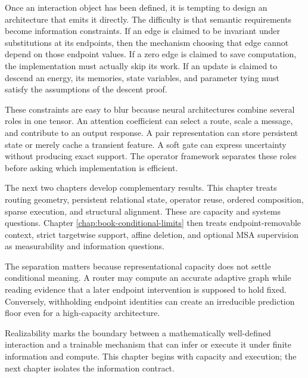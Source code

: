 Once an interaction object has been defined, it is tempting to design an architecture that emits
it directly.  The difficulty is that semantic requirements become information constraints.  If an
edge is claimed to be invariant under substitutions at its endpoints, then the mechanism choosing
that edge cannot depend on those endpoint values.  If a zero edge is claimed to save computation,
the implementation must actually skip its work.  If an update is claimed to descend an energy,
its memories, state variables, and parameter tying must satisfy the assumptions of the descent
proof.

These constraints are easy to blur because neural architectures combine several roles in one
tensor.  An attention coefficient can select a route, scale a message, and contribute to an output
response.  A pair representation can store persistent state or merely cache a transient feature.
A soft gate can express uncertainty without producing exact support.  The operator framework
separates these roles before asking which implementation is efficient.

The next two chapters develop complementary results.  This chapter treats routing geometry,
persistent relational state, operator reuse, ordered composition, sparse execution, and structural
alignment.  These are capacity and systems questions.  Chapter
\ref{chap:book-conditional-limits} then treats endpoint-removable context, strict targetwise
support, affine deletion, and optional MSA supervision as measurability and information questions.

The separation matters because representational capacity does not settle conditional meaning.  A
router may compute an accurate adaptive graph while reading evidence that a later endpoint
intervention is supposed to hold fixed.  Conversely, withholding endpoint identities can create an
irreducible prediction floor even for a high-capacity architecture.

Realizability marks the boundary between a mathematically well-defined interaction and a trainable
mechanism that can infer or execute it under finite information and compute.  This chapter begins
with capacity and execution; the next chapter isolates the information contract.
